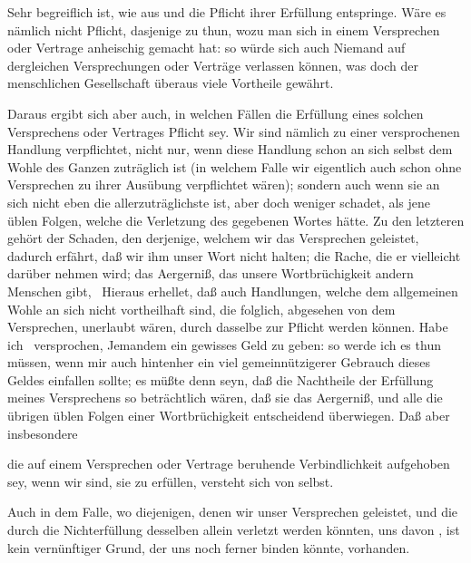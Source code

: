 \begin{aufza}
\item Sehr begreiflich ist, wie aus  und  die Pflicht ihrer Erfüllung entspringe. Wäre es nämlich nicht Pflicht, dasjenige zu thun, wozu man sich in einem Versprechen oder Vertrage anheischig gemacht hat: so würde sich auch Niemand auf dergleichen Versprechungen oder Verträge verlassen können, was doch der menschlichen Gesellschaft überaus viele Vortheile gewährt.
\item Daraus ergibt sich aber auch, in welchen Fällen die Erfüllung eines solchen Versprechens oder Vertrages Pflicht sey. Wir sind nämlich zu einer versprochenen Handlung verpflichtet, nicht nur, wenn diese Handlung schon an sich selbst dem Wohle des Ganzen zuträglich ist (in welchem Falle wir eigentlich auch schon ohne Versprechen zu ihrer Ausübung verpflichtet wären); sondern auch wenn sie an sich nicht eben die allerzuträglichste ist, aber doch weniger schadet, als jene üblen Folgen, welche die Verletzung des gegebenen Wortes hätte. Zu den letzteren gehört der Schaden, den derjenige, welchem wir das Versprechen geleistet, dadurch erfährt, daß wir ihm unser Wort nicht halten; die Rache, die er vielleicht darüber nehmen wird; das Aergerniß, das unsere Wortbrüchigkeit andern Menschen gibt, \usw\ Hieraus erhellet, daß auch Handlungen, welche dem allgemeinen Wohle an sich nicht vortheilhaft sind, die folglich, abgesehen von dem Versprechen, unerlaubt wären, durch dasselbe zur Pflicht werden können. Habe ich \zB\  versprochen, Jemandem ein gewisses Geld zu geben: so werde ich es thun müssen, wenn mir auch hintenher ein viel gemeinnützigerer Gebrauch dieses Geldes einfallen sollte; es müßte denn seyn, daß die Nachtheile der Erfüllung meines Versprechens so beträchtlich wären, daß sie das Aergerniß, und alle die übrigen üblen Folgen einer Wortbrüchigkeit entscheidend überwiegen. Daß aber insbesondere
\begin{aufzb}
\item die auf einem Versprechen oder Vertrage beruhende Verbindlichkeit aufgehoben sey, wenn wir  sind, sie zu erfüllen, versteht sich von selbst.
\item Auch in dem Falle, wo diejenigen, denen wir unser Versprechen geleistet, und die durch die Nichterfüllung desselben allein verletzt werden könnten, uns davon , ist kein vernünftiger Grund, der uns noch ferner binden könnte, vorhanden.

\end{aufzb}
\end{aufza}
